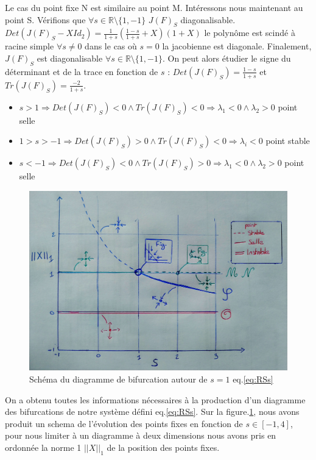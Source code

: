 \documentclass{wsdcr}
\begin{document}
Le cas du point fixe N est similaire au point M. Intéressons nous maintenant au point S. Vérifions que $\forall s \in \mathds{R}\setminus \{1,-1\}$ $J(F)_{S}$ diagonalisable. $Det(J(F)_{S}-XId_2)=\frac{1}{1+s}(\frac{1-s}{1+s}+X)(1+X)$ le polynôme est scindé à racine simple $\forall s \neq 0$ dans le cas où $s=0$ la jacobienne est diagonale. Finalement, $J(F)_{S}$ est diagonalisable $\forall s \in \mathds{R}\setminus \{1,-1\}$. On peut alors étudier le signe du déterminant et de la trace en fonction de $s$ : $Det(J(F)_{S})=\frac{1-s}{1+s}$ et $Tr(J(F)_{S})=\frac{-2}{1+s}$.
\begin{itemize}
	\item $s>1 \Rightarrow Det(J(F)_{S})<0 \land Tr(J(F)_{S})<0 \Rightarrow \lambda_1<0 \land \lambda_2>0$ {\color{red}point selle}
	\item $1>s>-1 \Rightarrow Det(J(F)_{S})>0 \land Tr(J(F)_{S})<0 \Rightarrow \lambda_i<0$ {\color{red}point stable}
	\item $s<-1 \Rightarrow Det(J(F)_{S})<0 \land Tr(J(F)_{S})>0 \Rightarrow \lambda_1<0 \land \lambda_2>0$ {\color{red}point selle}
\end{itemize}
\begin{figure}
    \centering
    \includegraphics[width=\linewidth]{fig/dessin.jpg}
    \caption{Schéma du diagramme de bifurcation autour de $s=1$ eq.\ref{eq:RSs}}
    \label{fig:dessinlv2}
\end{figure}
On a obtenu toutes les informations nécessaires à la production d'un diagramme des bifurcations de notre système défini eq.\ref{eq:RSs}. Sur la figure.\ref{fig:dessinlv2}, nous avons produit un schema de l'évolution des points fixes en fonction de $s \in [-1,4]$, pour nous limiter à un diagramme à deux dimensions nous avons pris en ordonnée la norme 1 $||X||_1$ de la position des points fixes.
\end{document}
